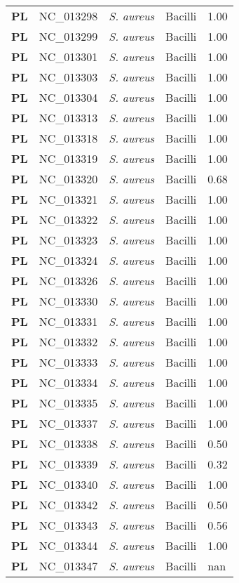 \begin{adjustwidth}{-3cm}{2cm}
{\begin{supertabular}{>{\bfseries}l|p{0.1\textwidth}p{0.14\textwidth}l|l}
PL & NC\_013298 & \textit{S. aureus} & Bacilli & 1.00\\
PL & NC\_013299 & \textit{S. aureus} & Bacilli & 1.00\\
PL & NC\_013301 & \textit{S. aureus} & Bacilli & 1.00\\
PL & NC\_013303 & \textit{S. aureus} & Bacilli & 1.00\\
PL & NC\_013304 & \textit{S. aureus} & Bacilli & 1.00\\
PL & NC\_013313 & \textit{S. aureus} & Bacilli & 1.00\\
PL & NC\_013318 & \textit{S. aureus} & Bacilli & 1.00\\
PL & NC\_013319 & \textit{S. aureus} & Bacilli & 1.00\\
PL & NC\_013320 & \textit{S. aureus} & Bacilli & 0.68\\
PL & NC\_013321 & \textit{S. aureus} & Bacilli & 1.00\\
PL & NC\_013322 & \textit{S. aureus} & Bacilli & 1.00\\
PL & NC\_013323 & \textit{S. aureus} & Bacilli & 1.00\\
PL & NC\_013324 & \textit{S. aureus} & Bacilli & 1.00\\
PL & NC\_013326 & \textit{S. aureus} & Bacilli & 1.00\\
PL & NC\_013330 & \textit{S. aureus} & Bacilli & 1.00\\
PL & NC\_013331 & \textit{S. aureus} & Bacilli & 1.00\\
PL & NC\_013332 & \textit{S. aureus} & Bacilli & 1.00\\
PL & NC\_013333 & \textit{S. aureus} & Bacilli & 1.00\\
PL & NC\_013334 & \textit{S. aureus} & Bacilli & 1.00\\
PL & NC\_013335 & \textit{S. aureus} & Bacilli & 1.00\\
PL & NC\_013337 & \textit{S. aureus} & Bacilli & 1.00\\
PL & NC\_013338 & \textit{S. aureus} & Bacilli & 0.50\\
PL & NC\_013339 & \textit{S. aureus} & Bacilli & 0.32\\
PL & NC\_013340 & \textit{S. aureus} & Bacilli & 1.00\\
PL & NC\_013342 & \textit{S. aureus} & Bacilli & 0.50\\
PL & NC\_013343 & \textit{S. aureus} & Bacilli & 0.56\\
PL & NC\_013344 & \textit{S. aureus} & Bacilli & 1.00\\
PL & NC\_013347 & \textit{S. aureus} & Bacilli & nan\\

\end{supertabular}}
\end{adjustwidth}
